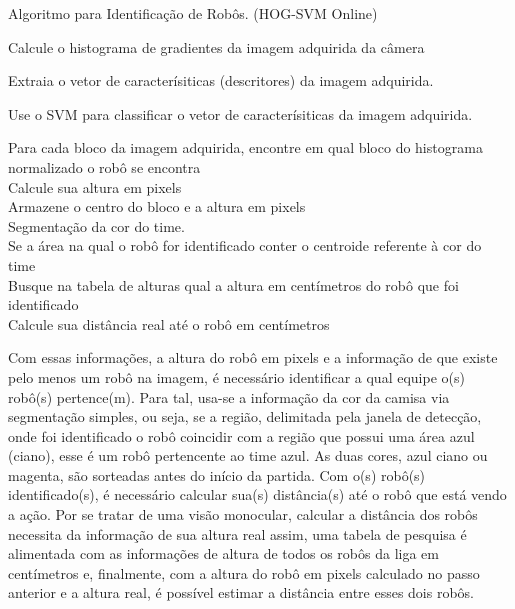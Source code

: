 \begin{algorithm}

\caption{Algoritmo para Identificação de Robôs. (HOG-SVM Online)}\label{lst:algROn}


{
Calcule o histograma de gradientes da imagem adquirida da câmera

Extraia o vetor de caracterísiticas (descritores) da imagem adquirida.

Use o SVM para classificar o vetor de caracterísiticas da imagem adquirida.

	{
		Para cada bloco da imagem adquirida, encontre em qual bloco do histograma normalizado o robô se encontra\\

		Calcule sua altura em pixels\\

		Armazene o centro do bloco e a altura em pixels\\

		Segmentação da cor do time.\\

		Se a área na qual o robô for identificado conter o centroide referente à cor do time\\

		Busque na tabela de alturas qual a altura em centímetros do robô que foi identificado\\

		Calcule sua distância real até o robô em centímetros\\
	}

}


\end{algorithm}

Com essas informações, a altura do robô em pixels e a informação de que existe pelo menos um robô na imagem, é necessário identificar a qual equipe o(s) robô(s) pertence(m). Para tal, usa-se a informação da cor da camisa via segmentação simples, ou seja, se a região, delimitada pela janela de detecção, onde foi identificado o robô coincidir com a região que possui uma área azul (ciano), esse é um robô pertencente ao time azul. As duas cores, azul ciano ou magenta, são sorteadas antes do início da partida. Com o(s) robô(s) identificado(s), é necessário calcular sua(s) distância(s) até o robô que está vendo a ação. Por se tratar de uma visão monocular, calcular a distância dos robôs necessita da informação de sua altura real assim, uma tabela de pesquisa é alimentada com as informações de altura de todos os robôs da liga em centímetros e, finalmente, com a altura do robô em pixels calculado no passo anterior e a altura real, é possível estimar a distância entre esses dois robôs.

